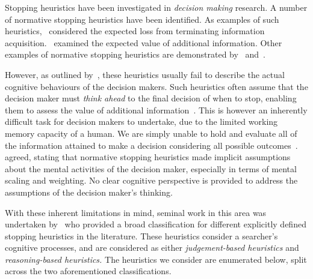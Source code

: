 Stopping heuristics have been investigated in \emph{decision making} research. A number of normative stopping heuristics have been identified. As examples of such heuristics,~\cite{busemeyer1988deferred_decision_making} considered the expected loss from terminating information acquisition.~\cite{kogut1990sunk_costs} examined the expected value of additional information. Other examples of normative stopping heuristics are demonstrated by~\cite{pitz1969information_seeking} and~\cite{busemeyer1988deferred_decision_making}.

However, as outlined by~\cite{browne2004stopping_rules}, these heuristics usually fail to describe the actual cognitive behaviours of the decision makers. Such heuristics often assume that the decision maker must \emph{think ahead} to the final decision of when to stop, enabling them to assess the value of additional information~\citep{busemeyer1988deferred_decision_making}. This is however an inherently difficult task for decision makers to undertake, due to the limited working memory capacity of a human. We are simply unable to hold and evaluate all of the information attained to make a decision considering all possible outcomes~\citep{browne2004stopping_rules}.~\cite{nickles1995judgment} agreed, stating that normative stopping heuristics made implicit assumptions about the mental activities of the decision maker, especially in terms of mental scaling and weighting. No clear cognitive perspective is provided to address the assumptions of the decision maker's thinking.

With these inherent limitations in mind, seminal work in this area was undertaken by~\cite{nickles1995judgment} who provided a broad classification for different explicitly defined stopping heuristics in the literature. These heuristics consider a searcher's cognitive processes, and are considered as either \emph{judgement-based heuristics} and \emph{reasoning-based heuristics.} The heuristics we consider are enumerated below, split across the two aforementioned classifications.

